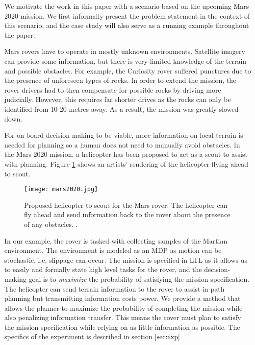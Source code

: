 We motivate the work in this paper with a scenario based on the upcoming Mars 2020 mission. We first informally present the problem statement in the context of this scenario, and the case study will also serve as a running example throughout the paper. 

Mars rovers have to operate in mostly unknown environments. Satellite imagery can provide some information, but there is very limited knowledge of the terrain and possible obstacles. For example, the Curiosity rover suffered punctures due to the presence of unforeseen types of rocks. In order to extend the mission, the rover drivers  had to then compensate for possible rocks by driving more judicially. However, this requires far shorter drives as the rocks can only be identified from 10-20 metres away. As a result, the mission was greatly slowed down. 

For on-board decision-making to be viable, more information on local terrain is needed for planning so a human does not need to manually avoid obstacles. In the Mars 2020 mission, a helicopter has been proposed to act as a scout \cite{landau2015helicopter} to assist with planning. Figure \ref{fig:mars2020} shows an artists' rendering of the helicopter flying ahead to scout.

\begin{figure}
\centering
\texttt{[image: mars2020.jpg]}
\caption{Proposed helicopter to scout for the Mars rover. The helicopter can fly ahead and send information back to the rover about the presence of any obstacles. \cite{landau2015helicopter}.}\label{fig:mars2020}
\end{figure}

In our example, the rover is tasked with collecting samples of the Martian environment. The environment is modeled as an MDP as motion can be stochastic, i.e, slippage can occur. The mission is specified in LTL as it allows us to easily and formally state high level tasks for the rover, and the decision-making goal is to \emph{maximize} the probability of satisfying the mission specification. The helicopter can send terrain information to the rover to assist in path planning but transmitting information costs power. We provide a method that allows the planner to maximize the probability of completing the mission while also penalizing information transfer. This means the rover must plan to satisfy the mission specification while relying on as little information as possible. The specifics of the experiment is described in section $\ref{sec:exp}$